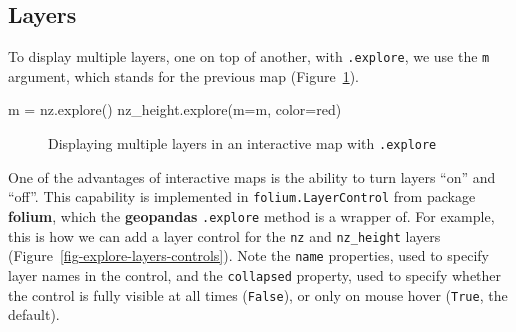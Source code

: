 \documentclass[
  letterpaper,
]{krantz}
\newenvironment{Shaded}{\begin{snugshade}}{\end{snugshade}}
\newcommand{\NormalTok}[1]{\textcolor[rgb]{0.00,0.23,0.31}{#1}}
\newcommand{\OperatorTok}[1]{\textcolor[rgb]{0.37,0.37,0.37}{#1}}
\newcommand{\StringTok}[1]{\textcolor[rgb]{0.13,0.47,0.30}{#1}}
\begin{document}
\subsection{Layers}\label{layers}

To display multiple layers, one on top of another, with
\texttt{.explore}, we use the \texttt{m} argument, which stands for the
previous map (Figure~\ref{fig-explore-layers}).

\begin{Shaded}
\begin{Highlighting}[]
\NormalTok{m }\OperatorTok{=}\NormalTok{ nz.explore()}
\NormalTok{nz\_height.explore(m}\OperatorTok{=}\NormalTok{m, color}\OperatorTok{=}\StringTok{\textquotesingle{}red\textquotesingle{}}\NormalTok{)}
\end{Highlighting}
\end{Shaded}

\begin{figure}


\caption{\label{fig-explore-layers}Displaying multiple layers in an
interactive map with \texttt{.explore}}

\end{figure}%

One of the advantages of interactive maps is the ability to turn layers
``on'' and ``off''. This capability is implemented in
\texttt{folium.LayerControl} from package \textbf{folium}, which the
\textbf{geopandas} \texttt{.explore} method is a wrapper of. For
example, this is how we can add a layer control for the \texttt{nz} and
\texttt{nz\_height} layers (Figure~\ref{fig-explore-layers-controls}).
Note the \texttt{name} properties, used to specify layer names in the
control, and the \texttt{collapsed} property, used to specify whether
the control is fully visible at all times (\texttt{False}), or only on
mouse hover (\texttt{True}, the default).
\end{document}
